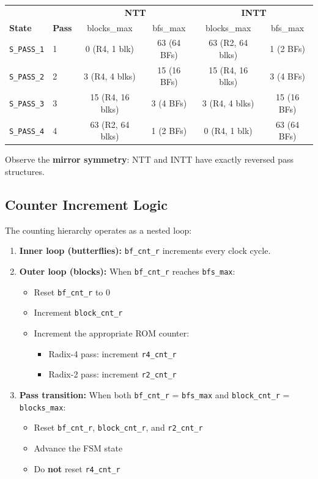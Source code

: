 \documentclass[11pt,a4paper]{article}
\newcommand{\sv}[1]{\texttt{#1}}
\begin{document}
\begin{center}
\renewcommand{\arraystretch}{1.15}
\begin{tabular}{ll|cc|cc}
  \toprule
  & & \multicolumn{2}{c|}{\textbf{NTT}} & \multicolumn{2}{c}{\textbf{INTT}} \\
  \textbf{State} & \textbf{Pass} & blocks\_max & bfs\_max & blocks\_max & bfs\_max \\
  \midrule
  \sv{S\_PASS\_1} & 1 & 0 (R4, 1 blk)   & 63 (64 BFs) & 63 (R2, 64 blks) & 1 (2 BFs) \\
  \sv{S\_PASS\_2} & 2 & 3 (R4, 4 blks)   & 15 (16 BFs) & 15 (R4, 16 blks) & 3 (4 BFs) \\
  \sv{S\_PASS\_3} & 3 & 15 (R4, 16 blks) & 3 (4 BFs)   & 3 (R4, 4 blks)   & 15 (16 BFs) \\
  \sv{S\_PASS\_4} & 4 & 63 (R2, 64 blks) & 1 (2 BFs)   & 0 (R4, 1 blk)    & 63 (64 BFs) \\
  \bottomrule
\end{tabular}
\end{center}

Observe the \textbf{mirror symmetry}: NTT and INTT have exactly reversed pass structures.

\subsection{Counter Increment Logic}

The counting hierarchy operates as a nested loop:

\begin{enumerate}
  \item \textbf{Inner loop (butterflies):} \sv{bf\_cnt\_r} increments every clock cycle.
  \item \textbf{Outer loop (blocks):} When \sv{bf\_cnt\_r} reaches \sv{bfs\_max}:
    \begin{itemize}
      \item Reset \sv{bf\_cnt\_r} to 0
      \item Increment \sv{block\_cnt\_r}
      \item Increment the appropriate ROM counter:
        \begin{itemize}
          \item Radix-4 pass: increment \sv{r4\_cnt\_r}
          \item Radix-2 pass: increment \sv{r2\_cnt\_r}
        \end{itemize}
    \end{itemize}
  \item \textbf{Pass transition:} When both \sv{bf\_cnt\_r} = \sv{bfs\_max} and \sv{block\_cnt\_r} = \sv{blocks\_max}:
    \begin{itemize}
      \item Reset \sv{bf\_cnt\_r}, \sv{block\_cnt\_r}, and \sv{r2\_cnt\_r}
      \item Advance the FSM state
      \item Do \textbf{not} reset \sv{r4\_cnt\_r}
    \end{itemize}
\end{enumerate}
\end{document}

